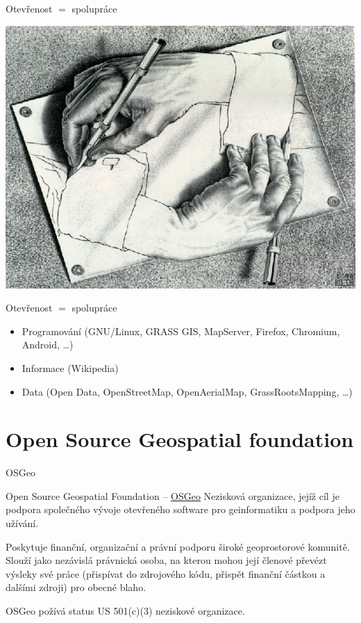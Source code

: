 \documentclass{beamer}
\begin{document}
\begin{frame}{Otevřenost $=$ spolupráce}
        \begin{center}
            \includegraphics[width=\textheight]{imgs/ils/escher.jpg}
        \end{center}
\end{frame}

\begin{frame}{Otevřenost $=$ spolupráce}
    \begin{itemize}
        \item Programování (GNU/Linux, GRASS GIS, MapServer, Firefox, Chromium,
        Android, \dots)
            \pause
        \item Informace (Wikipedia)
            \pause
        \item Data (Open Data, OpenStreetMap, OpenAerialMap, GrassRootsMapping,
        \dots)
    \end{itemize}
\end{frame}

\section{Open Source Geospatial foundation}

\begin{frame}{OSGeo}
\begin{block}{Open Source Geospatial Foundation -- \href{http://osgeo.org}{OSGeo}}
Nezisková organizace, jejíž cíl je podpora společného vývoje otevřeného software
pro geinformatiku a podpora jeho užívání. 

Poskytuje finanční, organizační a právní podporu široké geoprostorové komunitě.
Slouží jako nezávislá právnická osoba, na kterou mohou její členové převézt
výsleky své práce (přispívat do zdrojového kódu, přispět finanční částkou a
dalšími zdroji) pro obecné blaho.

OSGeo požívá status US 501(c)(3) neziskové organizace.
\end{block}
\end{frame}
\end{document}

